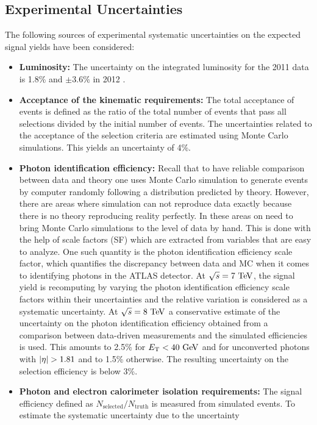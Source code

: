 \subsection{Experimental Uncertainties}
The following sources of experimental systematic uncertainties on the expected
signal yields have been considered:
\begin{itemize}
\item \textbf{Luminosity:}
The uncertainty on the integrated luminosity for the 2011 data is 1.8\% 
and $\pm 3.6\%$ in 2012 \cite{ATLAS:2012roa}.
%
\item \textbf{Acceptance of the kinematic requirements:}
The total acceptance of \HToZg events is defined as the ratio of the total number
of \HToZg events that pass all selections divided by the initial number of \HToZg
events. The uncertainties related to the acceptance of the selection criteria are
estimated using Monte Carlo simulations. This yields an uncertainty of 4\%.
%
\item \textbf{Photon identification efficiency:} 
Recall that to have reliable comparison between data and theory one uses Monte Carlo
simulation to generate events by computer randomly following a distribution predicted
by theory. However, there are areas where simulation can not reproduce data exactly
because there is no theory reproducing reality perfectly. In these areas on
need to bring Monte Carlo simulations to the level of data by hand. This is done
with the help of scale factors (SF) which are extracted from variables that are
easy to analyze. One such quantity is the photon identification efficiency scale
factor, which quantifies the discrepancy between data and MC when it comes to
identifying photons in the ATLAS detector. At $\rts = 7 \TeV$, the signal
yield is recomputing by varying the photon identification efficiency scale factors
within their uncertainties and the relative variation is considered as a systematic
uncertainty. At $\rts = 8 \TeV$ a conservative estimate of the uncertainty on the
photon identification efficiency obtained from a comparison between data-driven
measurements and the simulated efficiencies is used. This amounts to 2.5\% for
$\et < 40 \GeV$ and for unconverted photons with $\abseta > 1.81$ and to 1.5\%
otherwise. The resulting uncertainty on the \HToZg selection efficiency is below
3\%.
%
\item \textbf{Photon and electron calorimeter isolation requirements:}
The signal efficiency defined as $N_{\text{selected}}/N_{\text{truth}}$ 
is measured from simulated events. 
To estimate the systematic uncertainty due to the uncertainty

\end{itemize}

